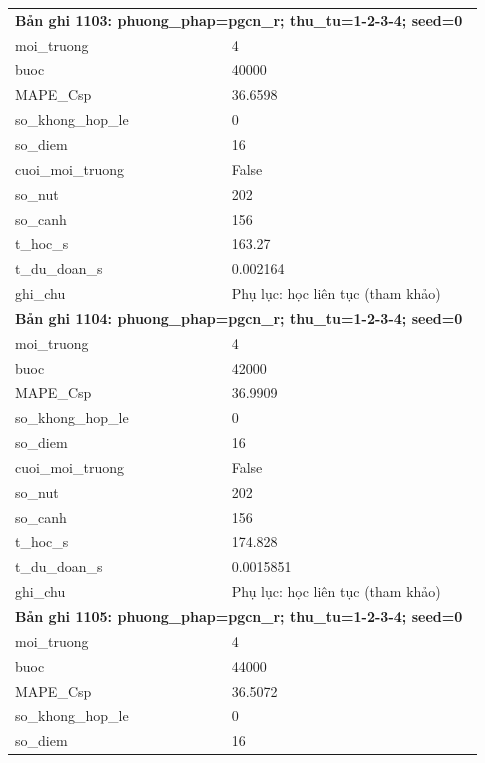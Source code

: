 \begin{longtable}{p{0.43\linewidth}p{0.50\linewidth}}
\midrule
\multicolumn{2}{p{0.95\linewidth}}{\textbf{Bản ghi 1103: phuong\_phap=pgcn\_r; thu\_tu=1-2-3-4; seed=0}} \\
moi\_\allowbreak truong & 4 \\
buoc & 40000 \\
MAPE\_\allowbreak Csp & 36.6598 \\
so\_\allowbreak khong\_\allowbreak hop\_\allowbreak le & 0 \\
so\_\allowbreak diem & 16 \\
cuoi\_\allowbreak moi\_\allowbreak truong & False \\
so\_\allowbreak nut & 202 \\
so\_\allowbreak canh & 156 \\
t\_\allowbreak hoc\_\allowbreak s & 163.27 \\
t\_\allowbreak du\_\allowbreak doan\_\allowbreak s & 0.002164 \\
ghi\_\allowbreak chu & Phụ lục: học liên tục (tham khảo) \\
\midrule
\multicolumn{2}{p{0.95\linewidth}}{\textbf{Bản ghi 1104: phuong\_phap=pgcn\_r; thu\_tu=1-2-3-4; seed=0}} \\
moi\_\allowbreak truong & 4 \\
buoc & 42000 \\
MAPE\_\allowbreak Csp & 36.9909 \\
so\_\allowbreak khong\_\allowbreak hop\_\allowbreak le & 0 \\
so\_\allowbreak diem & 16 \\
cuoi\_\allowbreak moi\_\allowbreak truong & False \\
so\_\allowbreak nut & 202 \\
so\_\allowbreak canh & 156 \\
t\_\allowbreak hoc\_\allowbreak s & 174.828 \\
t\_\allowbreak du\_\allowbreak doan\_\allowbreak s & 0.0015851 \\
ghi\_\allowbreak chu & Phụ lục: học liên tục (tham khảo) \\
\midrule
\multicolumn{2}{p{0.95\linewidth}}{\textbf{Bản ghi 1105: phuong\_phap=pgcn\_r; thu\_tu=1-2-3-4; seed=0}} \\
moi\_\allowbreak truong & 4 \\
buoc & 44000 \\
MAPE\_\allowbreak Csp & 36.5072 \\
so\_\allowbreak khong\_\allowbreak hop\_\allowbreak le & 0 \\
so\_\allowbreak diem & 16 \\

\end{longtable}
